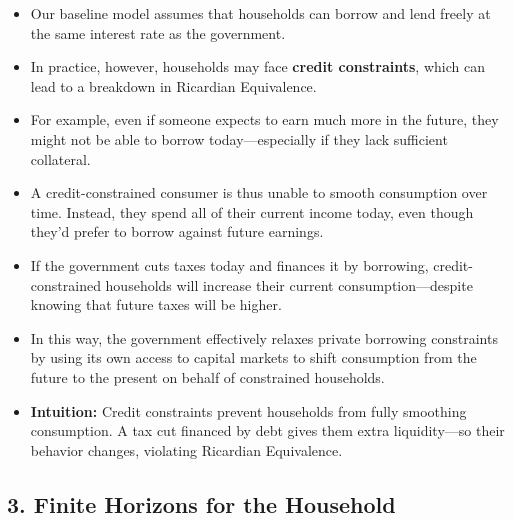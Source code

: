 \documentclass[12pt]{article}
\begin{document}
\begin{itemize}
\item Our baseline model assumes that households can borrow and lend freely at the same interest rate as the government.

\item In practice, however, households may face \textbf{credit constraints}, which can lead to a breakdown in Ricardian Equivalence.

\item For example, even if someone expects to earn much more in the future, they might not be able to borrow today—especially if they lack sufficient collateral.

\item A credit-constrained consumer is thus unable to smooth consumption over time. Instead, they spend all of their current income today, even though they'd prefer to borrow against future earnings.

\item If the government cuts taxes today and finances it by borrowing, credit-constrained households will increase their current consumption—despite knowing that future taxes will be higher.

\item In this way, the government effectively relaxes private borrowing constraints by using its own access to capital markets to shift consumption from the future to the present on behalf of constrained households.

\item \textbf{Intuition:} Credit constraints prevent households from fully smoothing consumption. A tax cut financed by debt gives them extra liquidity—so their behavior changes, violating Ricardian Equivalence.
\end{itemize}

\subsection*{\noindent\textbf{3. Finite Horizons for the Household}}
\end{document}
